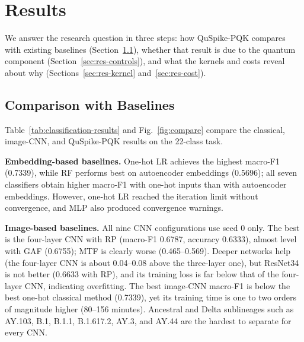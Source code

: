 \documentclass[conference]{IEEEtran}
\begin{document}
\section{Results}
\label{sec:result}

We answer the research question in three steps: how QuSpike-PQK compares with existing baselines (Section~\ref{sec:res-baselines}), whether that result is due to the quantum component (Section~\ref{sec:res-controls}), and what the kernels and costs reveal about why (Sections~\ref{sec:res-kernel} and~\ref{sec:res-cost}).

\subsection{Comparison with Baselines}
\label{sec:res-baselines}

Table~\ref{tab:classification-results} and Fig.~\ref{fig:compare} compare the classical, image-CNN, and QuSpike-PQK results on the 22-class task.

\textbf{Embedding-based baselines.} One-hot LR achieves the highest macro-F1 (0.7339), while RF performs best on autoencoder embeddings (0.5696); all seven classifiers obtain higher macro-F1 with one-hot inputs than with autoencoder embeddings. However, one-hot LR reached the iteration limit without convergence, and MLP also produced convergence warnings.

\textbf{Image-based baselines.} All nine CNN configurations use seed 0 only. The best is the four-layer CNN with RP (macro-F1 0.6787, accuracy 0.6333), almost level with GAF (0.6755); MTF is clearly worse (0.465--0.569). Deeper networks help (the four-layer CNN is about 0.04--0.08 above the three-layer one), but ResNet34 is not better (0.6633 with RP), and its training loss is far below that of the four-layer CNN, indicating overfitting. The best image-CNN macro-F1 is below the best one-hot classical method (0.7339), yet its training time is one to two orders of magnitude higher (80--156 minutes). Ancestral and Delta sublineages such as AY.103, B.1, B.1.1, B.1.617.2, AY.3, and AY.44 are the hardest to separate for every CNN.
\end{document}

